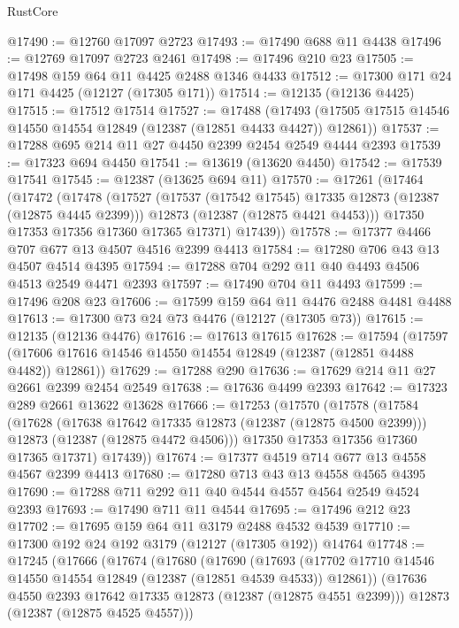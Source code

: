 \begin{lexlean}{RustCore}
\begin{coremodule}
@17490 := @12760 @17097 @2723
@17493 := @17490 @688 @11 @4438
@17496 := @12769 @17097 @2723 @2461
@17498 := @17496 @210 @23
@17505 := @17498 @159 @64 @11 @4425 @2488 @1346 @4433
@17512 := @17300 @171 @24 @171 @4425 (@12127 (@17305 @171))
@17514 := @12135 (@12136 @4425)
@17515 := @17512 @17514
@17527 := @17488
    (@17493 (@17505 @17515 @14546 @14550 @14554 @12849 (@12387 (@12851 @4433 @4427)) @12861))
@17537 := @17288 @695 @214 @11 @27 @4450 @2399 @2454 @2549 @4444 @2393
@17539 := @17323 @694 @4450
@17541 := @13619 (@13620 @4450)
@17542 := @17539 @17541
@17545 := @12387 (@13625 @694 @11)
@17570 := @17261
    (@17464
      (@17472
        (@17478
          (@17527
            (@17537 (@17542 @17545) @17335 @12873 (@12387 (@12875 @4445 @2399)))
            @12873
            (@12387 (@12875 @4421 @4453)))
          @17350
          @17353
          @17356
          @17360
          @17365
          @17371)
        @17439))
@17578 := @17377 @4466 @707 @677 @13 @4507 @4516 @2399 @4413
@17584 := @17280 @706 @43 @13 @4507 @4514 @4395
@17594 := @17288 @704 @292 @11 @40 @4493 @4506 @4513 @2549 @4471 @2393
@17597 := @17490 @704 @11 @4493
@17599 := @17496 @208 @23
@17606 := @17599 @159 @64 @11 @4476 @2488 @4481 @4488
@17613 := @17300 @73 @24 @73 @4476 (@12127 (@17305 @73))
@17615 := @12135 (@12136 @4476)
@17616 := @17613 @17615
@17628 := @17594
    (@17597 (@17606 @17616 @14546 @14550 @14554 @12849 (@12387 (@12851 @4488 @4482)) @12861))
@17629 := @17288 @290
@17636 := @17629 @214 @11 @27 @2661 @2399 @2454 @2549
@17638 := @17636 @4499 @2393
@17642 := @17323 @289 @2661 @13622 @13628
@17666 := @17253
    (@17570
      (@17578
        (@17584
          (@17628
            (@17638 @17642 @17335 @12873 (@12387 (@12875 @4500 @2399)))
            @12873
            (@12387 (@12875 @4472 @4506)))
          @17350
          @17353
          @17356
          @17360
          @17365
          @17371)
        @17439))
@17674 := @17377 @4519 @714 @677 @13 @4558 @4567 @2399 @4413
@17680 := @17280 @713 @43 @13 @4558 @4565 @4395
@17690 := @17288 @711 @292 @11 @40 @4544 @4557 @4564 @2549 @4524 @2393
@17693 := @17490 @711 @11 @4544
@17695 := @17496 @212 @23
@17702 := @17695 @159 @64 @11 @3179 @2488 @4532 @4539
@17710 := @17300 @192 @24 @192 @3179 (@12127 (@17305 @192)) @14764
@17748 := @17245
    (@17666
      (@17674
        (@17680
          (@17690
            (@17693
              (@17702 @17710 @14546 @14550 @14554 @12849 (@12387 (@12851 @4539 @4533)) @12861))
            (@17636 @4550 @2393 @17642 @17335 @12873 (@12387 (@12875 @4551 @2399)))
            @12873
            (@12387 (@12875 @4525 @4557)))

\end{coremodule}
\end{lexlean}
